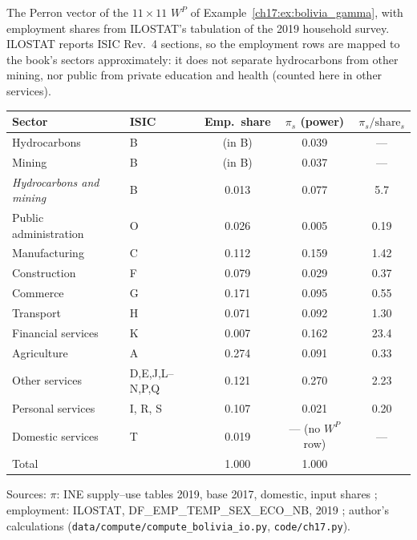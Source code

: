 \documentclass[../structural_economics_book.tex]{subfiles}
\begin{document}
\begin{example}\label{ch17:ex:bolivia_pi}
The Perron vector of the $11 \times 11$ $W^P$ of Example~\ref{ch17:ex:bolivia_gamma}, with employment shares from ILOSTAT's tabulation of the 2019 household survey. ILOSTAT reports ISIC Rev.~4 sections, so the employment rows are mapped to the book's sectors approximately: it does not separate hydrocarbons from other mining, nor public from private education and health (counted here in other services).

\begin{center}
\small
\begin{tabular}{llccc}
\toprule
Sector & ISIC & Emp.\ share & $\pi_s$ (power) & $\pi_s/\text{share}_s$ \\
\midrule
Hydrocarbons & B & (in B) & 0.039 & --- \\
Mining & B & (in B) & 0.037 & --- \\
\quad\textit{Hydrocarbons and mining} & B & 0.013 & 0.077 & 5.7 \\
Public administration & O & 0.026 & 0.005 & 0.19 \\
Manufacturing & C & 0.112 & 0.159 & 1.42 \\
Construction & F & 0.079 & 0.029 & 0.37 \\
Commerce & G & 0.171 & 0.095 & 0.55 \\
Transport & H & 0.071 & 0.092 & 1.30 \\
Financial services & K & 0.007 & 0.162 & 23.4 \\
Agriculture & A & 0.274 & 0.091 & 0.33 \\
Other services & D,E,J,L--N,P,Q & 0.121 & 0.270 & 2.23 \\
Personal services & I, R, S & 0.107 & 0.021 & 0.20 \\
Domestic services & T & 0.019 & --- (no $W^P$ row) & --- \\
\midrule
Total & & 1.000 & 1.000 & \\
\bottomrule
\end{tabular}
\par\footnotesize Sources: $\pi$: INE supply--use tables 2019, base 2017, domestic, input shares \citep{ine2026sut}; employment: ILOSTAT, DF\_EMP\_TEMP\_SEX\_ECO\_NB, 2019 \citep{ilo2026ilostat}; author's calculations (\texttt{data/compute/compute\_bolivia\_io.py}, \texttt{code/ch17.py}).
\end{center}


\end{example}
\end{document}
